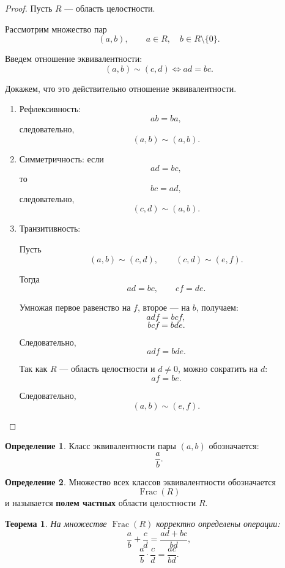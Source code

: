 \documentclass[12pt, a4paper]{article}
\newtheorem{theorem}{Теорема}
\theoremstyle{definition}
\newtheorem{definition}{Определение}
\theoremstyle{remark}
\begin{document}
\begin{proof}
	Пусть $R$ --- область целостности.
	
	Рассмотрим множество пар
	\[
	(a,b),
	\qquad
	a\in R,\quad b\in R\setminus\{0\}.
	\]
	
	Введем отношение эквивалентности:
	\[
	(a,b)\sim(c,d)
	\iff
	ad=bc.
	\]
	
	Докажем, что это действительно отношение эквивалентности.
	
	\begin{enumerate}
		\item Рефлексивность:
		\[
		ab=ba,
		\]
		следовательно,
		\[
		(a,b)\sim(a,b).
		\]
		
		\item Симметричность:
		если
		\[
		ad=bc,
		\]
		то
		\[
		bc=ad,
		\]
		следовательно,
		\[
		(c,d)\sim(a,b).
		\]
		
		\item Транзитивность:
		
		Пусть
		\[
		(a,b)\sim(c,d),
		\qquad
		(c,d)\sim(e,f).
		\]
		
		Тогда
		\[
		ad=bc,
		\qquad
		cf=de.
		\]
		
		Умножая первое равенство на $f$, второе --- на $b$,
		получаем:
		\[
		adf=bcf,
		\]
		\[
		bcf=bde.
		\]
		
		Следовательно,
		\[
		adf=bde.
		\]
		
		Так как $R$ --- область целостности и $d\ne0$,
		можно сократить на $d$:
		\[
		af=be.
		\]
		
		Следовательно,
		\[
		(a,b)\sim(e,f).
		\]
	\end{enumerate}
\end{proof}

\begin{definition}
	Класс эквивалентности пары $(a,b)$ обозначается:
	\[
	\frac{a}{b}.
	\]
\end{definition}

\begin{definition}
	Множество всех классов эквивалентности обозначается
	\[
	\operatorname{Frac}(R)
	\]
	и называется \textbf{полем частных} области целостности $R$.
\end{definition}

\begin{theorem}
	На множестве $\operatorname{Frac}(R)$ корректно определены операции:
	\[
	\frac{a}{b}+\frac{c}{d}
	=
	\frac{ad+bc}{bd},
	\]
	\[
	\frac{a}{b}\cdot\frac{c}{d}
	=
	\frac{ac}{bd}.
	\]
\end{theorem}
\end{document}
